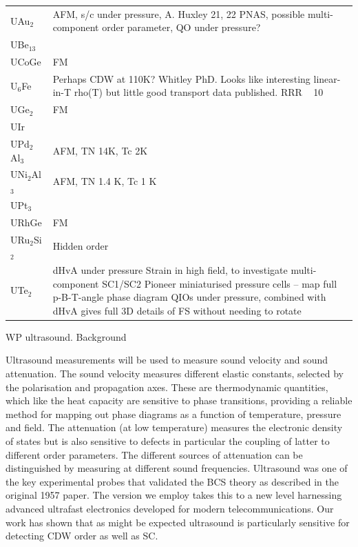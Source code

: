 \begin{table}
  \begin{tabular}{l l}
    UAu$_2$ &
    AFM, s/c under pressure, A. Huxley 21, 22 PNAS, possible multi-component order parameter, QO under pressure?
    \\

    UBe$_{13}$ & \\
    
    UCoGe & 
    FM \\
    
    U$_6$Fe & 
    Perhaps CDW at 110K? Whitley PhD. Looks like interesting linear-in-T rho(T) but little good transport data published. RRR ~ 10 \\
    
    UGe$_2$  & FM \\
    UIr & \\
    UPd$_2$Al$_3$ & 
    AFM, TN 14K, Tc 2K
    \\

    UNi$_2$Al$_3$ &
    AFM, TN 1.4 K, Tc 1 K
    \\

    UPt$_3$ & \\
  
    URhGe & 
    FM
    \\

    URu$_2$Si$_2$ & 
    Hidden order \\
  
    UTe$_2$ & 
      dHvA under pressure
      Strain in high field, to investigate multi-component SC1/SC2
      Pioneer miniaturised pressure cells – map full p-B-T-angle phase diagram 
      QIOs under pressure, combined with dHvA gives full 3D details of FS without needing to rotate \\
  \end{tabular}
\end{table}

WP ultrasound.
Background

Ultrasound measurements will be used to measure sound velocity and sound attenuation. The sound velocity measures different elastic constants, selected by the polarisation and propagation axes. These are thermodynamic quantities, which like the heat capacity are sensitive to phase transitions, providing a reliable method for mapping out phase diagrams as a function of temperature, pressure and field. The attenuation (at low temperature) measures the electronic density of states but is also sensitive to defects in particular the coupling of latter to different order parameters. The different sources of attenuation can be distinguished by measuring at different sound frequencies. Ultrasound was one of the key experimental probes that validated the BCS theory as described in the original 1957 paper. The version we employ takes this to a new level harnessing advanced ultrafast electronics developed for modern telecommunications. Our work has shown that as might be expected ultrasound is particularly sensitive for detecting CDW order as well as SC.


